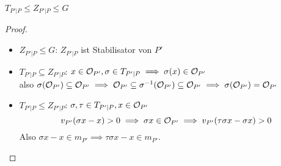 \begin{lemma}
    $T_{P'|P} \leq Z_{P'|P} \leq G$
\end{lemma}
\begin{proof}
    \begin{itemize}
        \item $Z_{P'|P} \leq G$: $Z_{P'|P}$ ist Stabilisator von $P'$
        \item $T_{P'|P} \subseteq Z_{P'|P}$: $x \in \mathcal{O}_{P'}, \sigma \in T_{P'|P} \implies \sigma(x) \in \mathcal{O}_{P'}$\\
        also $\sigma(\mathcal{O}_{P'}) \subseteq \mathcal{O}_{P'} \implies \mathcal{O}_{P'} \subseteq \sigma^{-1}(\mathcal{O}_{P'}) \subseteq \mathcal{O}_{P'} 
        \implies \sigma(\mathcal{O}_{P'}) = \mathcal{O}_{P'}$

        \item $T_{P'|P} \leq Z_{P'|P}$: $\sigma,\tau \in T_{P'|P}, x \in \mathcal{O}_{P'}$
        $$ v_{P'}(\sigma x - x) > 0 \implies \sigma x \in \mathcal{O}_{P'} \implies v_{P'}(\tau \sigma x - \sigma x) > 0$$
        Also $\sigma x - x \in m_{P'} \implies \tau\sigma x - x \in m_{P'}$.
    \end{itemize}
\end{proof}

